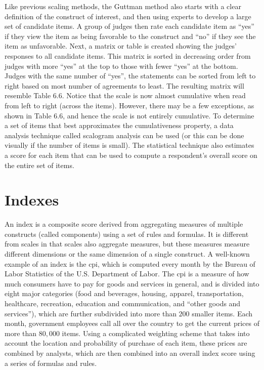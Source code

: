 Like previous scaling methods, the Guttman method also starts with a clear definition of the construct of interest, and then using experts to develop a large set of candidate items. A group of judges then rate each candidate item as ``yes'' if they view the item as being favorable to the construct and ``no'' if they see the item as unfavorable. Next, a matrix or table is created showing the judges' responses to all candidate items. This matrix is sorted in decreasing order from judges with more ``yes'' at the top to those with fewer ``yes'' at the bottom. Judges with the same number of ``yes'', the statements can be sorted from left to right based on most number of agreements to least. The resulting matrix will resemble Table 6.6. Notice that the scale is now almost cumulative when read from left to right (across the items). However, there may be a few exceptions, as shown in Table 6.6, and hence the scale is not entirely cumulative. To determine a set of items that best approximates the cumulativeness property, a data analysis technique called scalogram analysis can be used (or this can be done visually if the number of items is small). The statistical technique also estimates a score for each item that can be used to compute a respondent's overall score on the entire set of items.

\section{Indexes}

An index is a composite score derived from aggregating measures of multiple constructs (called components) using a set of rules and formulas. It is different from scales in that scales also aggregate measures, but these measures measure different dimensions or the same dimension of a single construct. A well-known example of an index is the \gls{cpi}, which is computed every month by the Bureau of Labor Statistics of the U.S. Department of Labor. The \gls{cpi} is a measure of how much consumers have to pay for goods and services in general, and is divided into eight major categories (food and beverages, housing, apparel, transportation, healthcare, recreation, education and communication, and ``other goods and services''), which are further subdivided into more than $ 200 $ smaller items. Each month, government employees call all over the country to get the current prices of more than $ 80,000 $ items. Using a complicated weighting scheme that takes into account the location and probability of purchase of each item, these prices are combined by analysts, which are then combined into an overall index score using a series of formulas and rules.

